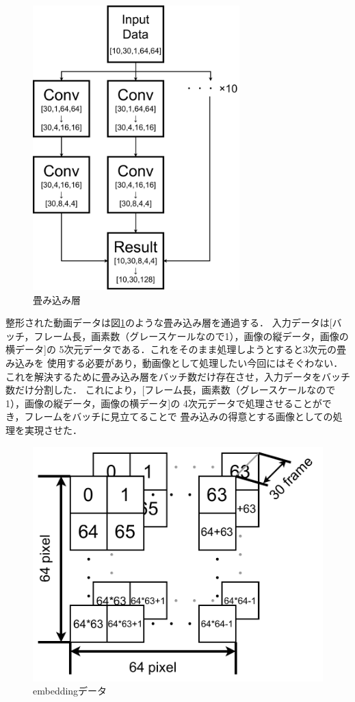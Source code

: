 \begin{figure}[t]
  \begin{center}
    \includegraphics[width=80mm]{images/chart/conv.pdf}
  \end{center}
  \caption{畳み込み層}
  \label{conv}
\end{figure}

整形された動画データは図\ref{conv}のような畳み込み層を通過する．
入力データは[バッチ，フレーム長，画素数（グレースケールなので1），画像の縦データ，画像の横データ]の
5次元データである．これをそのまま処理しようとすると3次元の畳み込みを
使用する必要があり，動画像として処理したい今回にはそぐわない．
これを解決するために畳み込み層をバッチ数だけ存在させ，入力データをバッチ数だけ分割した．
これにより，[フレーム長，画素数（グレースケールなので1），画像の縦データ，画像の横データ]の
4次元データで処理させることができ，フレームをバッチに見立てることで
畳み込みの得意とする画像としての処理を実現させた．
\clearpage

\begin{figure}[t]
  \begin{center}
    \includegraphics[width=120mm]{images/chart/embedding.pdf}
  \end{center}
  \caption{embeddingデータ}
  \label{embedding}
\end{figure}

